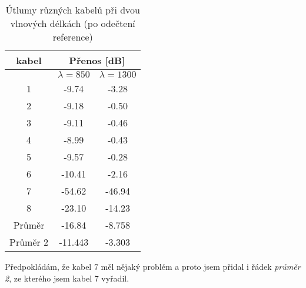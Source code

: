 \begin{table}[h]
    \centering
    \begin{tabular}{|c|c|c|}
        \hline
        \textbf{kabel}  & \multicolumn{2}{c|}{\textbf{Přenos [dB]}}                 \\ \hline
                        & $\lambda = 850$                   & $\lambda = 1300$      \\ \hline
        1               & -9.74                             & -3.28                 \\ \hline
        2               & -9.18                             & -0.50                 \\ \hline
        3               & -9.11                             & -0.46                 \\ \hline
        4               & -8.99                             & -0.43                 \\ \hline
        5               & -9.57                             & -0.28                 \\ \hline
        6               & -10.41                            & -2.16                 \\ \hline
        7               & -54.62                            & -46.94                \\ \hline
        8               & -23.10                            & -14.23                \\ \hline
        Průměr          & -16.84	                        & -8.758                \\ \hline
        Průměr 2        & -11.443 	                        & -3.303                \\ \hline
    \end{tabular}
    \caption{Útlumy různých kabelů při dvou vlnových délkách (po odečtení reference)}
\end{table}
Předpokládám, že kabel \(7\) měl nějaký problém a proto jsem přidal i řádek {\it průměr 2}, ze kterého jsem kabel 7 vyřadil.

